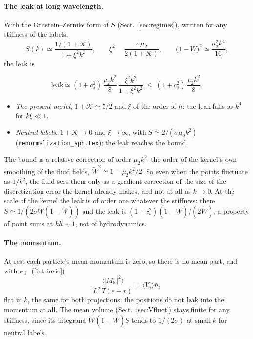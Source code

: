 \documentclass[11pt,aps,preprint,nofootinbib,superscriptaddress,tightenlines]{revtex4-2}
\newcommand{\avg}[1]{\langle #1\rangle}
\def\st{\begin{equation}}
\def\stp{\end{equation}}
\def\Eq#1{eq.~(\ref{#1})}
\def\Sect#1{Sect.~\ref{#1}}
\let\oldparagraph\paragraph
\renewcommand{\paragraph}{\par\bigskip\oldparagraph}
\begin{document}
\paragraph{The leak at long wavelength.}  With the Ornstein--Zernike form of $S$ (\Sect{sec:regimes}), written for any stiffness of the labels,
\st
S(k)\simeq\frac{1/(1+\mathcal K)}{1+\xi^2k^2},\qquad \xi^2=\frac{\sigma\mu_2}{2(1+\mathcal K)},\qquad \big(1-\widetilde W\big)^2\simeq\frac{\mu_2^2k^4}{16},
\stp
the leak is
\begin{keyeq}
\st
\text{leak}\simeq(1+c_s^2)\,\frac{\mu_2k^2}8\,\frac{\xi^2k^2}{1+\xi^2k^2}\;\le\;(1+c_s^2)\,\frac{\mu_2k^2}8 .
\label{leakbound}
\stp
\end{keyeq}
\begin{itemize}
\item \emph{The present model}, $1+\mathcal K\simeq5/2$ and $\xi$ of the order of $h$: the leak falls as $k^4$ for $k\xi\ll1$.
\item \emph{Neutral labels}, $1+\mathcal K\to0$ and $\xi\to\infty$, with $S\simeq2/(\sigma\mu_2k^2)$ (\nolinkurl{renormalization_sph.tex}): the leak reaches the bound.
\end{itemize}
The bound is a relative correction of order $\mu_2k^2$, the order of the kernel's own smoothing of the fluid fields, $\widetilde W^2\simeq1-\mu_2k^2/2$.  So even
when the points fluctuate as $1/k^2$, the fluid sees them only as a gradient correction of the size of the discretization error the kernel already makes, and
not at all as $k\to0$.  At the scale of the kernel the leak is of order one whatever the stiffness: there $S\simeq1/(2\sigma\widetilde W(1-\widetilde W))$ and the leak is
$(1+c_s^2)(1-\widetilde W)/(2\widetilde W)$, a property of point sums at $kh\sim1$, not of hydrodynamics.

\paragraph{The momentum.}  At rest each particle's mean momentum is zero, so there is no mean part, and with \Eq{intrinsic}
\st
\frac{\avg{|M_{\bm k}|^2}}{L^2\,T(e+p)}=\avg{V_a}\bar n ,
\label{Mpred}
\stp
flat in $k$, the same for both projections: the positions do not leak into the momentum at all.  The mean volume (\Sect{sec:Vfluct}) stays finite for any
stiffness, since its integrand $\widetilde W(1-\widetilde W)S$ tends to $1/(2\sigma)$ at small $k$ for neutral labels.

\end{document}
